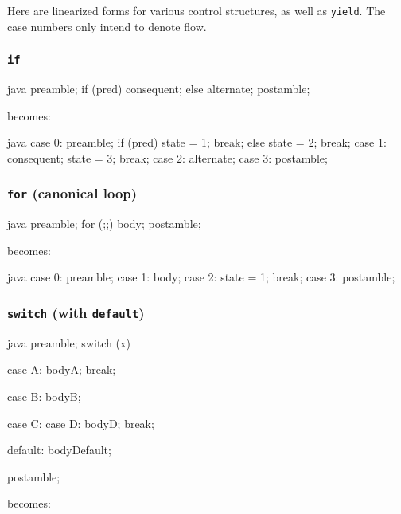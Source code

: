 \documentclass[journal,a4paper]{IEEEtran}
\begin{document}
Here are linearized forms for various control structures, as well as \texttt{yield}. The case
numbers only intend to denote flow.

\subsubsection{\texttt{if}}

\begin{pygmented}{java}
preamble;
if (pred) {
    consequent;
} else {
    alternate;
}
postamble;
\end{pygmented}

becomes:

\begin{pygmented}{java}
case 0:
    preamble;
    if (pred) {
        state = 1;
        break;
    } else {
        state = 2;
        break;
    }
case 1:
    consequent;
    state = 3;
    break;
case 2:
    alternate;
case 3:
    postamble;
\end{pygmented}

\subsubsection{\texttt{for} (canonical loop)}

\begin{pygmented}{java}
preamble;
for (;;) {
    body;
}
postamble;
\end{pygmented}

becomes:

\begin{pygmented}{java}
case 0:
    preamble;
case 1:
    body;
case 2:
    state = 1;
    break;
case 3:
    postamble;
\end{pygmented}

\subsubsection{\texttt{switch} (with \texttt{default})}

\begin{pygmented}{java}
preamble;
switch (x) {
    case A:
        bodyA;
        break;

    case B:
        bodyB;

    case C:
    case D:
        bodyD;
        break;

    default:
        bodyDefault;
}
postamble;
\end{pygmented}

becomes:
\end{document}
